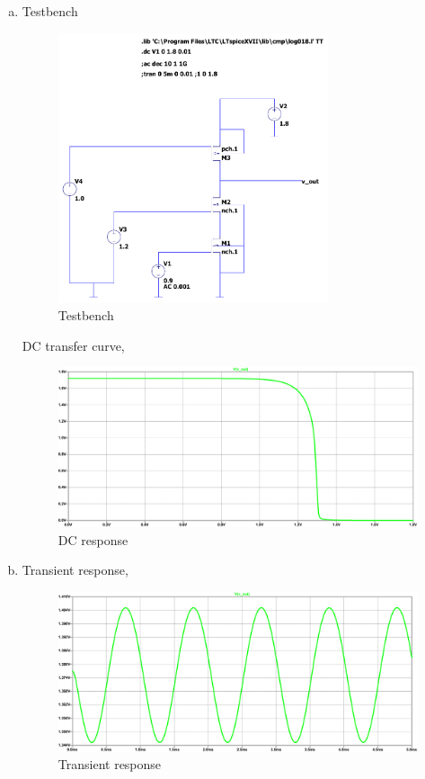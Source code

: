 \documentclass{article}
\begin{document}
\begin{enumerate}[(a)]
\item Testbench
\begin{figure}[H]
\centering
\includegraphics[height=300px]{img/q4/testbench.pdf}
\caption{\label{fig:testbench-q4}Testbench}
\end{figure}

DC transfer curve,
\begin{figure}[H]
\centering
\includegraphics[width=.9\linewidth]{img/q4/vout-vin-dc.pdf}
\caption{\label{fig:vout-vin-dc-q3}DC response}
\end{figure}

\item Transient response,

\begin{figure}[H]
\centering
\includegraphics[width=.9\linewidth]{img/q4/transient.pdf}
\caption{\label{fig:trans-q4}Transient response}
\end{figure}


\end{enumerate}
\end{document}
